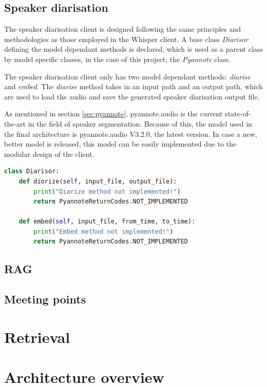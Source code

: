 \documentclass[twoside]{uva-inf-bachelor-thesis}
\begin{document}
\subsection{Speaker diarisation}
The speaker diarisation client is designed following the same principles and methodologies as those employed in the Whisper client. A base class \textit{Diarisor} defining the model dependant methods is declared, which is used as a parent class by model specific classes, in the case of this project, the \textit{Pyannote} class.

The speaker diarisation client only has two model dependant methods: \textit{diarise} and \textit{embed}. The \textit{diarise} method takes in an input path and an output path, which are used to load the audio and save the generated speaker diarisation output file.

As mentioned in section \ref{sec:pyannote}, pyannote.audio is the current state-of-the-art in the field of speaker segmentation. Because of this, the model used in the final architecture is pyannote.audio V3.2.0, the latest version. In case a new, better model is released, this model can be easily implemented due to the modular design of the client.

\begin{lstlisting}[language=Python, caption={Modular speaker diarisation class.}]
class Diarisor:
    def diorize(self, input_file, output_file):
        print("Diarize method not implemented!")
        return PyannoteReturnCodes.NOT_IMPLEMENTED

    def embed(self, input_file, from_time, to_time):
        print("Embed method not implemented!")
        return PyannoteReturnCodes.NOT_IMPLEMENTED
\end{lstlisting}

\subsection{RAG}

\subsection{Meeting points}

\section{Retrieval}

\section{Architecture overview}
\end{document}
